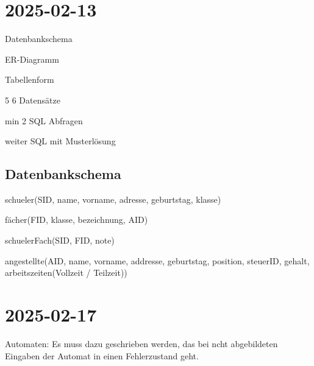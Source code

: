 \section{2025-02-13}

\startitemize[packed]
\item Datenbankschema
\item ER-Diagramm
\item Tabellenform
\item 5 6 Datensätze
\item min 2 SQL Abfragen
\item weiter SQL mit Musterlösung
\stopitemize


\subsection{Datenbankschema}

schueler(SID, name, vorname, adresse, geburtstag, klasse)

fächer(FID, klasse, bezeichnung, AID)

schuelerFach(SID, FID, note)

angestellte(AID, name, vorname, addresse, geburtstag, position, steuerID, gehalt, arbeitszeiten(Vollzeit / Teilzeit))

\section{2025-02-17}

\startframedtipp
Automaten: Es muss dazu geschrieben werden, das bei ncht abgebildeten Eingaben der Automat in einen Fehlerzustand geht. 
\stopframedtipp
